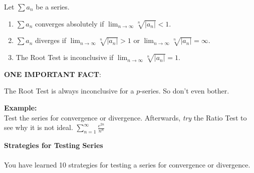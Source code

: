 \documentclass[addpoints, 12pt]{exam}
\begin{document}
\newpage

\begin{tcolorbox}[title= THE ROOT TEST,black,sharp corners,colback=white,colbacktitle=white,coltitle=black]

    Let
    $\displaystyle\sum a_n$ be a series.
    \begin{enumerate}
        \item $\displaystyle\sum a_n$ converges absolutely if $\displaystyle\lim_{n\to\infty}\sqrt[n]{\left|a_n\right|}<1$.
        \item $\displaystyle\sum a_n$ diverges if $\displaystyle\lim_{n\to\infty}\sqrt[n]{\left|a_n\right|}>1$ or $\displaystyle\lim_{n\to\infty}\sqrt[n]{\left|a_n\right|}=\infty$.
        \item The Root Test is inconclusive if $\displaystyle\lim_{n\to\infty}\sqrt[n]{\left|a_n\right|}=1$.
    \end{enumerate}

\end{tcolorbox}
\vspace{.1in}

\noindent\textbf{ONE IMPORTANT FACT}:
\begin{questions}
    \question The Root Test is always inconclusive for a $p$-series. So don't even bother.
\end{questions}
\vspace{.1in}
\noindent\textbf{Example:}\\
Test the series for convergence or divergence. Afterwards, \textit{try} the Ratio Test to see why it is not ideal.
$\displaystyle\sum_{n=1}^\infty \frac{e^{2n}}{n^n}$


\newpage

\noindent\textbf{\Large Strategies for Testing Series}\\
\\
You have learned 10 strategies for testing a series for convergence or divergence. 
\end{document}
